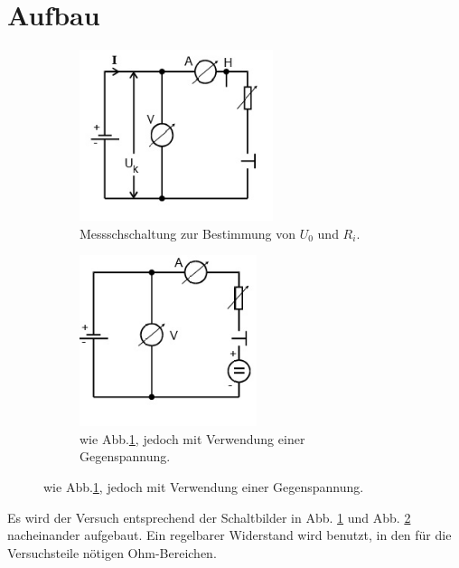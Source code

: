 \section{Aufbau}
\label{sec:Aufbau}
\begin{figure}
  \centering
  \begin{subfigure}{0.48\textwidth}
    \centering
    \includegraphics[height=5cm]{data/abb2.jpg}
    \caption{Messschschaltung zur Bestimmung von $U_0$ und $R_i$. \cite{V301}}
    \label{fig:abb2}
  \end{subfigure}
  \begin{subfigure}{0.48\textwidth}
    \centering
    \includegraphics[height=5cm]{data/abb3.jpg}
    \caption{wie Abb.\ref{fig:abb2}, jedoch mit Verwendung einer Gegenspannung. \cite{V301}}
    \label{fig:abb3}
  \end{subfigure}
  \label{fig:Phasen}
\end{figure}
Es wird der Versuch entsprechend der Schaltbilder in Abb. \ref{fig:abb2} und Abb. \ref{fig:abb3} nacheinander aufgebaut.
Ein regelbarer Widerstand wird benutzt, in den für die Versuchsteile nötigen Ohm-Bereichen.